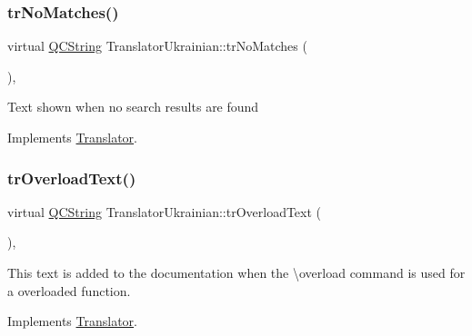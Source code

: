 \mbox{\label{class_translator_ukrainian_aabb76e52a8bec8b5f71982ad2fb5050b}} 
\subsubsection{\texorpdfstring{trNoMatches()}{trNoMatches()}}
{\footnotesize\ttfamily virtual \mbox{\hyperlink{class_q_c_string}{Q\+C\+String}} Translator\+Ukrainian\+::tr\+No\+Matches (\begin{DoxyParamCaption}{ }\end{DoxyParamCaption})\hspace{0.3cm}{\ttfamily [inline]}, {\ttfamily [virtual]}}

Text shown when no search results are found 

Implements \mbox{\hyperlink{class_translator}{Translator}}.

\mbox{\label{class_translator_ukrainian_a1328697f3b6775bb87f0230e5930fd4b}} 
\subsubsection{\texorpdfstring{trOverloadText()}{trOverloadText()}}
{\footnotesize\ttfamily virtual \mbox{\hyperlink{class_q_c_string}{Q\+C\+String}} Translator\+Ukrainian\+::tr\+Overload\+Text (\begin{DoxyParamCaption}{ }\end{DoxyParamCaption})\hspace{0.3cm}{\ttfamily [inline]}, {\ttfamily [virtual]}}

This text is added to the documentation when the \textbackslash{}overload command is used for a overloaded function. 

Implements \mbox{\hyperlink{class_translator}{Translator}}.

\mbox{\label{class_translator_ukrainian_a69a881c936b79c3aa4c2f5c66bb679e6}} 
